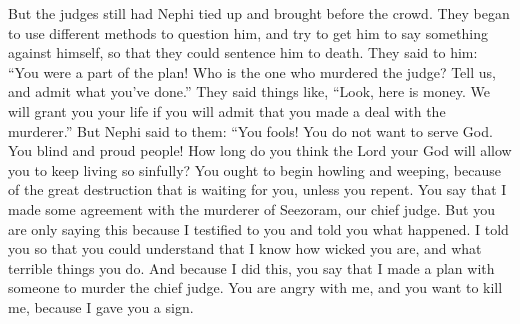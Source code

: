 But the judges still had Nephi tied up and brought before the crowd. They began to use different methods to question him, and try to get him to say something against himself, so that they could sentence him to death.
\bverse \iffalse Saying unto him: Thou art confederate; who is this man that hath done this murder? Now tell us, and acknowledge thy fault; saying, Behold here is money; and also we will grant unto thee thy life if thou wilt tell us, and acknowledge the agreement which thou hast made with him. \fi
They said to him: ``You were a part of the plan! Who is the one who murdered the judge? Tell us, and admit what you've done.'' They said things like, ``Look, here is money. We will grant you your life if you will admit that you made a deal with the murderer.''
\bverse \iffalse But Nephi said unto them: O ye fools, ye uncircumcised of heart, ye blind, and ye stiffnecked people, do ye know how long the Lord your God will suffer you that ye shall go on in this your way of sin? \fi
But Nephi said to them: ``You fools! You do not want to serve God. You blind and proud people! How long do you think the Lord your God will allow you to keep living so sinfully?
\bverse \iffalse O ye ought to begin to howl and mourn, because of the great destruction which at this time doth await you, except ye shall repent. \fi
You ought to begin howling and weeping, because of the great destruction that is waiting for you, unless you repent.
\bverse \iffalse Behold ye say that I have agreed with a man that he should murder Seezoram, our chief judge. But behold, I say unto you, that this is because I have testified unto you that ye might know concerning this thing; yea, even for a witness unto you, that I did know of the wickedness and abominations which are among you. \fi
You say that I made some agreement with the murderer of Seezoram, our chief judge. But you are only saying this because I testified to you and told you what happened. I told you so that you could understand that I know how wicked you are, and what terrible things you do.
\bverse \iffalse And because I have done this, ye say that I have agreed with a man that he should do this thing; yea, because I showed unto you this sign ye are angry with me, and seek to destroy my life. \fi
And because I did this, you say that I made a plan with someone to murder the chief judge. You are angry with me, and you want to kill me, because I gave you a sign.
\bverse \iffalse And now behold, I will show unto you another sign, and see if ye will in this thing seek to destroy me. \fi
